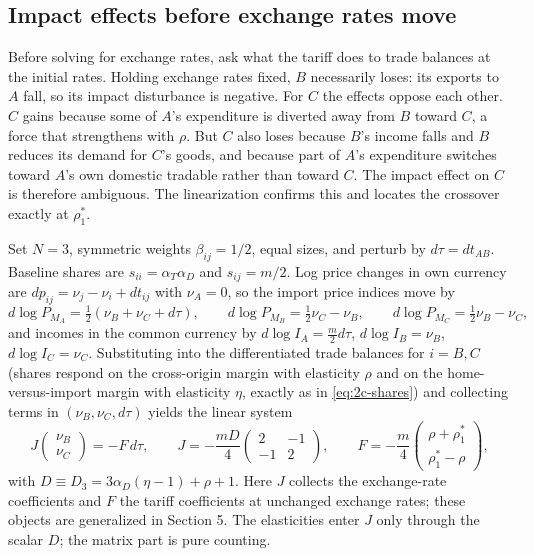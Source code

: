 \documentclass[11pt]{article}
\begin{document}
\subsection{Impact effects before exchange rates move}

Before solving for exchange rates, ask what the tariff does to trade balances at the initial rates. Holding exchange rates fixed, $B$ necessarily loses: its exports to $A$ fall, so its impact disturbance is negative. For $C$ the effects oppose each other. $C$ gains because some of $A$'s expenditure is diverted away from $B$ toward $C$, a force that strengthens with $\rho$. But $C$ also loses because $B$'s income falls and $B$ reduces its demand for $C$'s goods, and because part of $A$'s expenditure switches toward $A$'s own domestic tradable rather than toward $C$. The impact effect on $C$ is therefore ambiguous. The linearization confirms this and locates the crossover exactly at $\rho_1^*$.

Set $N = 3$, symmetric weights $\beta_{ij} = 1/2$, equal sizes, and perturb by $d\tau = dt_{AB}$. Baseline shares are $s_{ii} = \alpha_T\alpha_D$ and $s_{ij} = m/2$. Log price changes in own currency are $dp_{ij} = \nu_j - \nu_i + dt_{ij}$ with $\nu_A = 0$, so the import price indices move by
\begin{equation}
d\log P_{M_A} = \tfrac{1}{2}(\nu_B + \nu_C + d\tau), \qquad
d\log P_{M_B} = \tfrac{1}{2}\nu_C - \nu_B, \qquad
d\log P_{M_C} = \tfrac{1}{2}\nu_B - \nu_C ,
\label{eq:3c-indices}
\end{equation}
and incomes in the common currency by $d\log I_A = \tfrac{m}{2} d\tau$, $d\log I_B = \nu_B$, $d\log I_C = \nu_C$. Substituting into the differentiated trade balances for $i = B, C$ (shares respond on the cross-origin margin with elasticity $\rho$ and on the home-versus-import margin with elasticity $\eta$, exactly as in \eqref{eq:2c-shares}) and collecting terms in $(\nu_B, \nu_C, d\tau)$ yields the linear system
\begin{equation}
J
\begin{pmatrix} \nu_B \\ \nu_C \end{pmatrix}
= -F\, d\tau,
\qquad
J = -\frac{mD}{4}\begin{pmatrix} 2 & -1 \\ -1 & 2 \end{pmatrix},
\qquad
F = -\frac{m}{4}\begin{pmatrix} \rho + \rho_1^* \\ \rho_1^* - \rho \end{pmatrix},
\label{eq:3c-JF}
\end{equation}
with $D \equiv D_3 = 3\alpha_D(\eta-1) + \rho + 1$. Here $J$ collects the exchange-rate coefficients and $F$ the tariff coefficients at unchanged exchange rates; these objects are generalized in Section 5. The elasticities enter $J$ only through the scalar $D$; the matrix part is pure counting.
\end{document}
